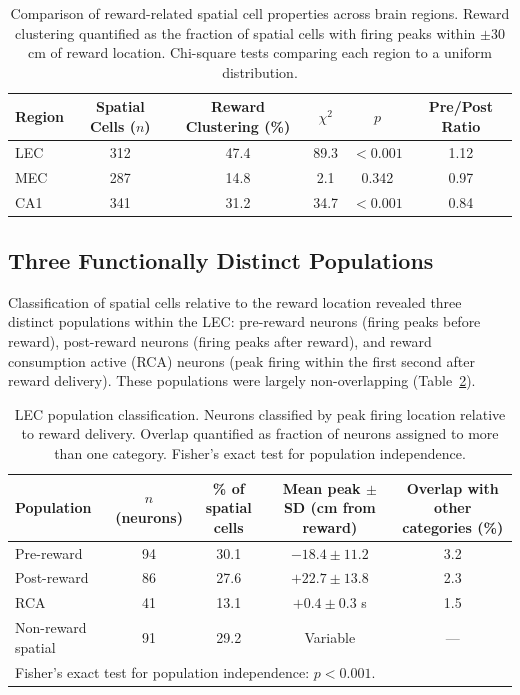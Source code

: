 \documentclass[11pt]{article}
\begin{document}
\begin{table}[H]
\centering
\caption{Comparison of reward-related spatial cell properties across brain regions. Reward clustering quantified as the fraction of spatial cells with firing peaks within $\pm$30 cm of reward location. Chi-square tests comparing each region to a uniform distribution.}
\label{tab:region_comparison}
\begin{tabular}{lccccc}
\toprule
\textbf{Region} & \textbf{Spatial Cells ($n$)} & \textbf{Reward Clustering (\%)} & \textbf{$\chi^2$} & \textbf{$p$} & \textbf{Pre/Post Ratio} \\
\midrule
LEC & 312 & 47.4 & 89.3 & $< 0.001$ & 1.12 \\
MEC & 287 & 14.8 & 2.1 & 0.342 & 0.97 \\
CA1 & 341 & 31.2 & 34.7 & $< 0.001$ & 0.84 \\
\bottomrule
\end{tabular}
\end{table}

\subsection{Three Functionally Distinct Populations}

Classification of spatial cells relative to the reward location revealed three distinct populations within the LEC: pre-reward neurons (firing peaks before reward), post-reward neurons (firing peaks after reward), and reward consumption active (RCA) neurons (peak firing within the first second after reward delivery). These populations were largely non-overlapping (Table~\ref{tab:populations}).

\begin{table}[H]
\centering
\caption{LEC population classification. Neurons classified by peak firing location relative to reward delivery. Overlap quantified as fraction of neurons assigned to more than one category. Fisher's exact test for population independence.}
\label{tab:populations}
\begin{tabular}{lcccc}
\toprule
\textbf{Population} & \textbf{$n$ (neurons)} & \textbf{\% of spatial cells} & \textbf{Mean peak $\pm$ SD (cm from reward)} & \textbf{Overlap with other categories (\%)} \\
\midrule
Pre-reward & 94 & 30.1 & $-18.4 \pm 11.2$ & 3.2 \\
Post-reward & 86 & 27.6 & $+22.7 \pm 13.8$ & 2.3 \\
RCA & 41 & 13.1 & $+0.4 \pm 0.3$ s & 1.5 \\
Non-reward spatial & 91 & 29.2 & Variable & --- \\
\bottomrule
\multicolumn{5}{l}{\small Fisher's exact test for population independence: $p < 0.001$.} \\
\end{tabular}
\end{table}
\end{document}
